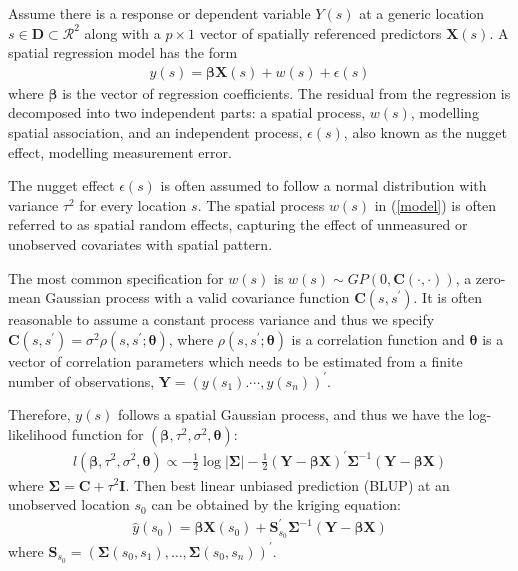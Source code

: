 \documentclass[
12pt, %
a4paper, %
oneside, %
headinclude,footinclude, %
BCOR5mm, %
]{scrartcl}
\begin{document}
Assume there is a response or dependent variable $Y(s)$ at a generic location $s \in \boldsymbol{D} \subset \mathcal{R}^2$ along with a $p \times 1$ vector of spatially referenced predictors $\boldsymbol{X}(s)$. A spatial regression model has the form
\begin{equation}
\begin{aligned}
y(s) = \boldsymbol{\beta}\boldsymbol{X}(s) + w(s) + \epsilon(s)
\end{aligned} \label{model}
\end{equation}
where $\boldsymbol{\beta}$ is the vector of regression coefficients. The residual from the regression is decomposed into two independent parts: a spatial process, $w(s)$, modelling spatial association, and an independent process, $\epsilon(s)$, also known as the nugget effect, modelling measurement error.

The nugget effect $\epsilon(s)$ is often assumed to follow a normal distribution with variance $\tau^2$ for every location $s$.
The spatial process $w(s)$ in (\ref{model}) is often referred to as spatial random effects, capturing the effect of unmeasured or unobserved covariates with spatial pattern.

The most common specification for $w(s)$ is $w(s) \sim GP(0, \boldsymbol{C}(\cdot, \cdot))$, a zero-mean Gaussian process with a valid covariance function $\boldsymbol{C}(s, s^\prime)$. It is often reasonable to assume a constant process variance and thus we specify \
$\boldsymbol{C}(s, s^\prime) = \sigma^2 \rho (s, s^\prime; \boldsymbol{\theta})$, where $\rho (s, s^\prime; \boldsymbol{\theta})$ is a correlation function and $\boldsymbol{\theta}$ is a vector of correlation parameters which needs to be estimated from a finite number of observations, $\boldsymbol{Y} = \left(y(s_1). \cdots, y(s_n)\right)^\prime$.

Therefore, $y(s)$ follows a spatial Gaussian process, and thus we have the log-likelihood function for $(\boldsymbol{\beta}, \tau^2, \sigma^2, \boldsymbol{\theta}):$
\begin{equation}
\begin{aligned}
l(\boldsymbol{\beta}, \tau^2, \sigma^2, \boldsymbol{\theta}) \propto  - \frac{1}{2}\log |\boldsymbol{\Sigma}| - \frac{1}{2}\left(\boldsymbol{Y} - \boldsymbol{\beta}\boldsymbol{X}\right)^\prime \boldsymbol{\Sigma}^{- 1}\left(\boldsymbol{Y} - \boldsymbol{\beta}\boldsymbol{X}\right)
\end{aligned} \label{loglik}
\end{equation}
where $\boldsymbol{\Sigma} = \boldsymbol{C} + \tau^2\boldsymbol{I}.$
Then best linear unbiased prediction (BLUP) at an unobserved location $s_0$ can be obtained by the kriging
equation:
\begin{equation}
\begin{aligned}
\hat{y}(s_0) = \boldsymbol{\beta}\boldsymbol{X}(s_0) + \boldsymbol{S}_{s_0}^\prime\boldsymbol{\Sigma}^{- 1}\left(\boldsymbol{Y} - \boldsymbol{\beta}\boldsymbol{X}\right)
\end{aligned} \label{Kriging}
\end{equation}
where $\boldsymbol{S}_{s_0} = \left(\boldsymbol{\Sigma}(s_0, s_1), \dots, \boldsymbol{\Sigma}(s_0, s_n)\right)^\prime$.
\end{document}
